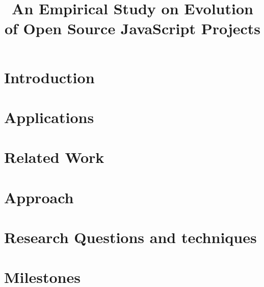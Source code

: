 \documentclass[conference]{IEEEtran}
\begin{document}
\title{An Empirical Study on Evolution of Open Source JavaScript Projects}

\author{
	
	}

\maketitle

\section{Introduction}
\label{sec:introduction}


\section{Applications}
\label{sec:applications}



\section{Related Work}
\label{sec:related_work}


\section{Approach}
\label{sec:approach}

	
\section{Research Questions and techniques}
\label{sec:rq}


\section{Milestones}
\label{milestones}




\end{document}
